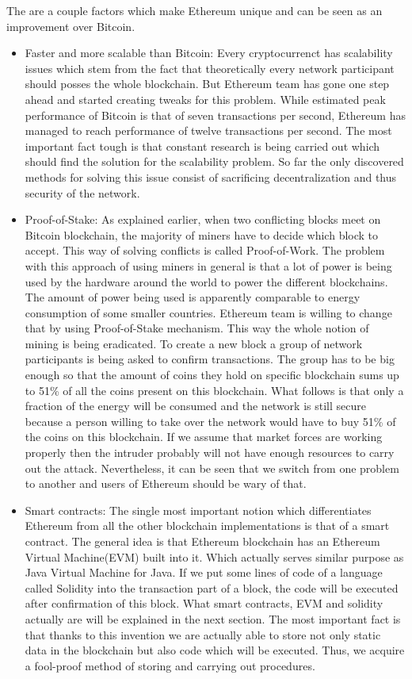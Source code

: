 \documentclass[a4paper,12pt,twoside,openany]{report}
\begin{document}
The are a couple factors which make Ethereum unique and can be seen as an improvement over Bitcoin. 
\begin{itemize}
\item Faster and more scalable than Bitcoin: Every cryptocurrenct has scalability issues which stem from the fact that theoretically every network participant should posses the whole blockchain. But Ethereum team has gone one step ahead and started creating tweaks for this problem. While estimated peak performance of Bitcoin is that of seven transactions per second, Ethereum has managed to reach performance of twelve transactions per second. The most important fact tough is that constant research is being carried out which should find the solution for the scalability problem. So far the only discovered methods for solving this issue consist of sacrificing decentralization and thus security of the network.

\item Proof-of-Stake: As explained earlier, when two conflicting blocks meet on Bitcoin blockchain, the majority of miners have to decide which block to accept. This way of solving conflicts is called Proof-of-Work. The problem with this approach of using miners in general is that a lot of power is being used by the hardware around the world to power the different blockchains. The amount of power being used is apparently comparable to energy consumption of some smaller countries. \cite{energy} Ethereum team is willing to change that by using Proof-of-Stake mechanism. This way the whole notion of mining is being eradicated. To create a new block a group of network participants is being asked to confirm transactions. The group has to be big enough so that the amount of coins they hold on specific blockchain sums up to 51\% of all the coins present on this blockchain. What follows is that only a fraction of the energy will be consumed and the network is still secure because a person willing to take over the network would have to buy 51\% of the coins on this blockchain. If we assume that market forces are working properly then the intruder probably will not have enough resources to carry out the attack. Nevertheless, it can be seen that we switch from one problem to another and users of Ethereum should be wary of that. 

\item Smart contracts: The single most important notion which differentiates Ethereum from all the other blockchain implementations is that of a smart contract. The general idea is that Ethereum blockchain has an Ethereum Virtual Machine(EVM) built into it. Which actually serves similar purpose as Java Virtual Machine for Java. If we put some lines of code of a language called Solidity into the transaction part of a block, the code will be executed after confirmation of this block. What smart contracts, EVM and solidity actually are will be explained in the next section. The most important fact is that thanks to this invention we are actually able to store not only static data in the blockchain but also code which will be executed. Thus, we acquire a fool-proof method of storing and carrying out procedures.
\end{itemize}
\end{document}
